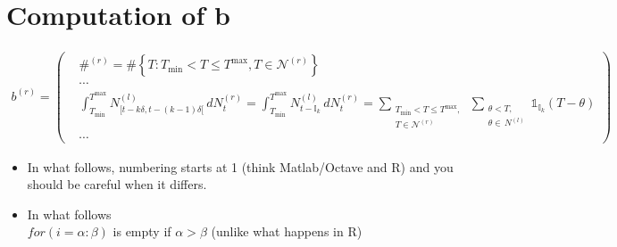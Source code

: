 \documentclass{article}
\newcommand{\be}{\begin{eqnarray*}}
\newcommand{\ee}{\end{eqnarray*}}
\newcommand{\dsp}{\displaystyle}
\def\Ik{\mathbb{I}_k}
\def\Tmin{T_{\min}}
\def\Tmax{T^{\max}}
\begin{document}
\section{Computation of b}
\be
b^{(r)} = \left(
\begin{array}{ll}
  &\#^{(r)} = \# \left\{T: \Tmin<T\leq\Tmax,T\in \mathcal{N}^{(r)}\right\}\\
  &\cdots\\
&\dsp\int_{\Tmin}^{\Tmax}N^{(l)}_{[t-k\delta,t-(k-1)\delta[}\,dN^{(r)}_t = \dsp\int_{\Tmin}^{\Tmax}N^{(l)}_{t-\Ik}\,dN^{(r)}_t =\dsp\sum_{\substack{\Tmin<T\leq\Tmax,\\T\in \mathcal{N}^{(r)}}}\,\sum_{\substack{\theta<T,\\ \theta\in\,N^{(l)}}}\mathds{1}_{\Ik}(T-\theta) \\
  &\cdots
\end{array}
\right)
\ee
{}
\begin{itemize}
\item In what follows, numbering starts at 1 (think Matlab/Octave and R) and you should be careful when it differs.
\item In what follows\\ $for(i= \alpha:\beta)$ is empty if $\alpha> \beta$ (unlike what happens in R)
\end{itemize}
\end{document}

